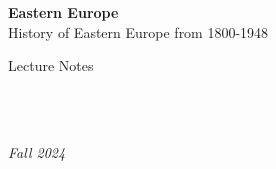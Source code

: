 \documentclass[11pt,fleqn]{book} %
\begin{document}

\begingroup
\thispagestyle{empty}
\centering
\vspace*{5cm}
\par\normalfont\fontsize{35}{35}\sffamily\selectfont
\textbf{Eastern Europe}\\
{\LARGE History of Eastern Europe from 1800-1948}\par %
\vspace*{1cm}
{\Huge Lecture Notes}\par %
\endgroup


\newpage
~\vfill
\thispagestyle{empty}



\\ %

\noindent \textit{Fall 2024} %



\pagestyle{empty} %

\tableofcontents %


\pagestyle{fancy} %


\end{document}
